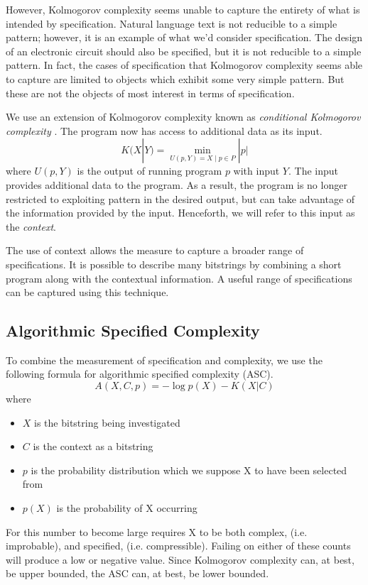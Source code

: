 However, Kolmogorov complexity seems unable to capture the entirety of what is intended by specification.
Natural language text is not reducible to a simple pattern; however, it is an example of what we'd consider specification.
The design of an electronic circuit should also be specified, but it is not reducible to a simple pattern.
In fact, the cases of specification that Kolmogorov complexity seems able to capture are limited to objects which exhibit some very simple pattern.
But these are not the objects of most interest in terms of specification.

We use an extension of Kolmogorov complexity known as {\it conditional Kolmogorov complexity} \cite{Kolmogorov1968}.
The program now has access to additional data as its input.
\begin{equation}
    K(X|Y) = \min_{U(p,Y) = X \mid p \in P} |p|
\end{equation} where $U(p,Y)$ is the output of running program $p$ with input $Y$.
The input provides additional data to the program.
As a result, the program is no longer restricted to exploiting pattern in the desired output, but can take advantage of the information provided by the input.
Henceforth, we will refer to this input as the {\it context}.

The use of context allows the measure to capture a broader range of specifications.
It is possible to describe many bitstrings by combining a short program along with the contextual information.
A useful range of specifications can be captured using this technique.

\subsection{Algorithmic Specified Complexity}

To combine the measurement of specification and complexity, we use the following formula for algorithmic specified complexity (ASC).
\begin{equation}
    \label{ASC}
    A(X,C,p) = -\log p(X) - K(X|C)
\end{equation} where
\begin{itemize}
    \item $X$ is the bitstring being investigated
    \item $C$ is the context as a bitstring
    \item $p$ is the probability distribution which we suppose X to have been selected from
    \item $p(X)$ is the probability of X occurring
\end{itemize}
For this number to become large requires X to be both complex, (i.e. improbable), and specified, (i.e. compressible).
Failing on either of these counts will produce a low or negative value.
Since Kolmogorov complexity can, at best, be upper bounded, the ASC can, at best, be lower bounded.

